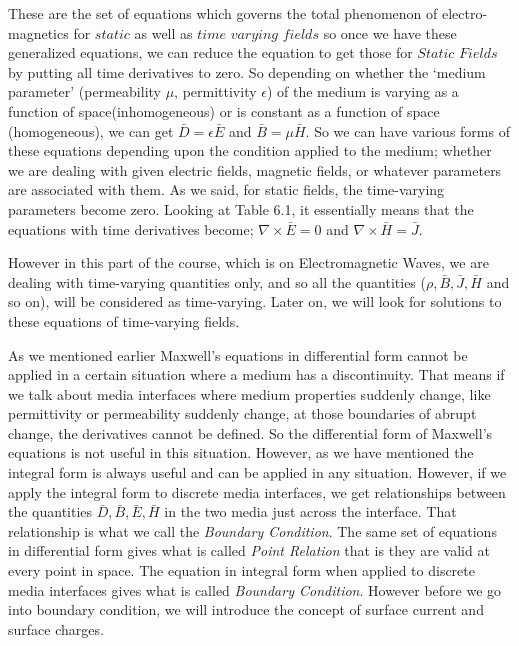 These are the set of equations which governs the total phenomenon of electro-magnetics for $static$ as well as $time$ $varying$ $fields$ so once we have these generalized equations, we can reduce the equation to get those for $Static$ $Fields$ by putting all time derivatives to zero. So depending on whether the `medium parameter' (permeability $\mu$, permittivity $\epsilon$) of the medium is varying as a function of space(inhomogeneous) or is constant as a function of space (homogeneous), we can get $\bar{D}=\epsilon\bar{E}$ and $\bar{B}=\mu\bar{H}$. So we can have various forms of these equations depending upon the condition applied to the medium; whether we are dealing with given electric fields, magnetic fields, or whatever parameters are associated with them. As we said, for static fields, the time-varying parameters become zero. Looking at Table 6.1, it essentially means that the equations with time derivatives become; $\nabla\times\bar{E}=0$ and $\nabla\times\bar{H}=\bar{J}$.

However in this part of the course, which is on Electromagnetic Waves, we are dealing with time-varying quantities only, and so all the quantities ($\rho,\bar{B},\bar{J},\bar{H}$ and so on), will be considered as time-varying. Later on, we will look for solutions to these equations of time-varying fields.

As we mentioned earlier Maxwell's equations in differential form cannot be applied in a certain situation where a medium has a discontinuity. That means if we talk about media interfaces where medium properties suddenly change, like permittivity or permeability suddenly change, at those boundaries of abrupt change, the derivatives cannot be defined. So the differential form of Maxwell's equations is not useful in this situation. However, as we have mentioned the integral form is always useful and can be applied in any situation. However, if we apply the integral form to discrete media interfaces, we get relationships between the quantities $\bar{D}, \bar{B}, \bar{E}, \bar{H}$ in the two media just across the interface. That relationship is what we call the \emph{Boundary Condition}. The same set of equations in differential form gives what is called \emph{Point Relation} that is they are valid at every point in space. The equation in integral form when applied to discrete media interfaces gives what is called \emph{Boundary Condition}. However before we go into boundary condition, we will introduce the concept of surface current and surface charges.

